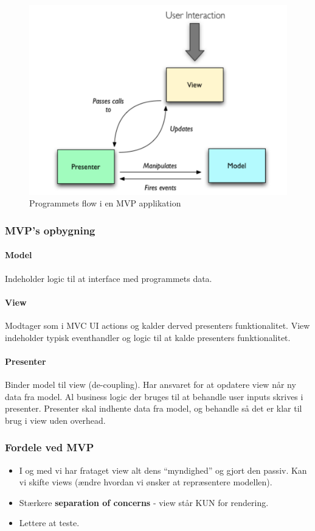\begin{figure}[h]
	\centering
	\includegraphics[width=0.8\linewidth]{figs/mvpFlow}
	\caption{Programmets flow i en MVP applikation}
	\label{fig:mvpFlow}
\end{figure}

\subsubsection{MVP's opbygning}
\paragraph{Model} Indeholder logic til at interface med programmets data.
\paragraph{View} Modtager som i MVC UI actions og kalder derved presenters funktionalitet. View indeholder typisk eventhandler og logic til at kalde presenters funktionalitet.
\paragraph{Presenter} Binder model til view (de-coupling). Har ansvaret for at opdatere view når ny data fra model. Al business logic der bruges til at behandle user inputs skrives i presenter. Presenter skal indhente data fra model, og behandle så det er klar til brug i view uden overhead.

\subsubsection{Fordele ved MVP}
\begin{itemize}
	\item I og med vi har frataget view alt dens “myndighed” og gjort den passiv. Kan vi skifte views (ændre hvordan vi ønsker at repræsentere modellen).
	\item Stærkere \textbf{separation of concerns} - view står KUN for rendering.
	\item Lettere at teste.
\end{itemize}

